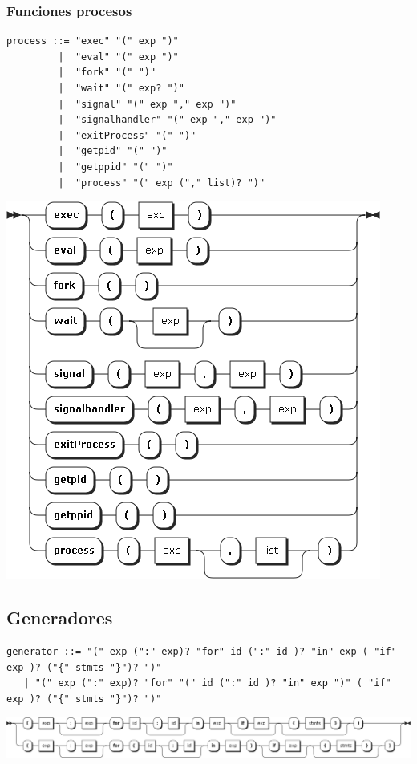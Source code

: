 \subsubsection{Funciones procesos}
\begin{multicols}{2}
\begin{lstlisting}[style=nonumbers, basicstyle=\tiny]      
process ::= "exec" "(" exp ")"
         |  "eval" "(" exp ")"
         |  "fork" "(" ")"
         |  "wait" "(" exp? ")"
         |  "signal" "(" exp "," exp ")"
         |  "signalhandler" "(" exp "," exp ")"
         |  "exitProcess" "(" ")"
         |  "getpid" "(" ")"
         |  "getppid" "(" ")"
         |  "process" "(" exp ("," list)? ")"
\end{lstlisting}  
\columnbreak	
\begin{center}
\includegraphics[scale=0.4]{diagram/process.png} \\
\end{center}
\end{multicols}

\subsection{Generadores}
\begin{lstlisting}[style=nonumbers, basicstyle=\tiny]      
generator ::= "(" exp (":" exp)? "for" id (":" id )? "in" exp ( "if" exp )? ("{" stmts "}")? ")"
   | "(" exp (":" exp)? "for" "(" id (":" id )? "in" exp ")" ( "if" exp )? ("{" stmts "}")? ")"
\end{lstlisting}  
\begin{center}
\includegraphics[scale=0.4]{diagram/generator.png} \\
\end{center}
